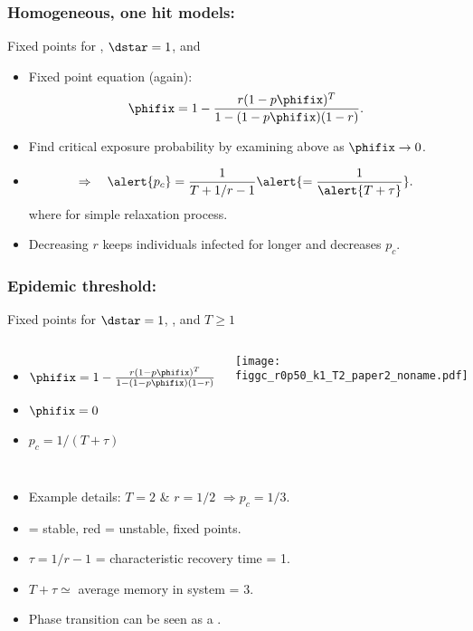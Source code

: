 \begin{frame}
  \frametitle{Homogeneous, one hit models:}

  \begin{block}{Fixed points for , $\dstar=1$, and }
    \begin{itemize}
    \item<1-> 
      Fixed point equation (again):
      $$
      \phifix =
      1 - \frac{r (1-p\phifix)^T }
      {1 - (1-p\phifix)(1-r)}.
      $$
    \item<2-> 
      Find critical exposure probability by examining
      above as $\phifix \rightarrow 0$.
    \item<3-> 
      $$
      \Rightarrow \quad 
      \alert{p_c} = \frac{1}{T + 1/r - 1} \alert{= \frac{1}{\alert{T + \tau}}}.
      $$
      where  for simple relaxation
      process.
    \item<4->
      Decreasing $r$ keeps individuals infected for longer
      and decreases $p_c$.
    \end{itemize}
  \end{block}
\end{frame}

\begin{frame}
  \frametitle{Epidemic threshold:}

  \begin{block}{Fixed points for $\dstar=1$, , and $T \ge 1$}
  \begin{columns}
    \begin{itemize}
    \item 
      $
      \phifix =
      1 - \frac{r (1-p\phifix)^T }
      {1 - (1-p\phifix)(1-r)}
      $
    \item
      $\phifix = 0$
    \item
      $p_c = 1/(T+\tau)$
    \end{itemize}
  \texttt{[image: figgc\_r0p50\_k1\_T2\_paper2\_noname.pdf]}
  \end{columns}
  \end{block}

  \begin{itemize}
  \item
    Example details:
    $T=2$ \& $r=1/2$ $\Rightarrow p_c = 1/3$.
  \item
     = stable, \alert{red} = unstable, fixed points.
  \item
    $\tau = 1/r - 1$ = characteristic recovery time = 1.
  \item
    $T + \tau \simeq $  average memory in system = 3.
  \item<2->
    Phase transition can be seen as
    a .\cite{strogatz1994a}
  \end{itemize}
\end{frame}

